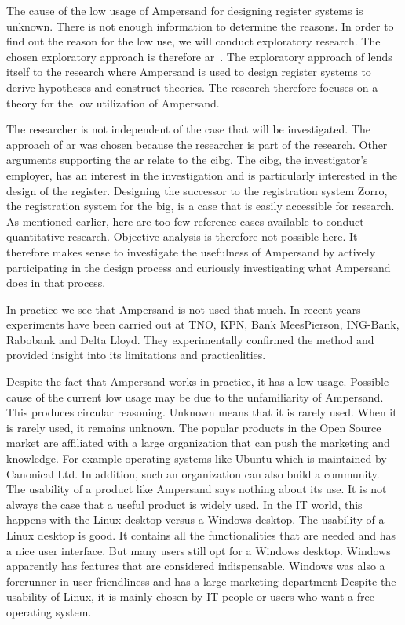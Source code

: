 The cause of the low usage of Ampersand for designing register systems is unknown.
There is not enough information to determine the reasons.
In order to find out the reason for the low use, we will conduct exploratory research.
The chosen exploratory approach is therefore \acrfull{ar}~\citep{Easterbrook}.
The exploratory approach of \cite{Easterbrook} lends itself to the research where Ampersand is used to design register systems to derive hypotheses and construct theories.
The research therefore focuses on a theory for the low utilization of Ampersand.

The researcher is not independent of the case that will be investigated.
The approach of \acrshort{ar} was chosen because the researcher is part of the research.
Other arguments supporting the \acrshort{ar} relate to the \acrshort{cibg}.
The \acrshort{cibg}, the investigator's employer, has an interest in the investigation and is particularly interested in the design of the register.
Designing the successor to the registration system Zorro, the registration system for the \acrshort{big}, is a case that is easily accessible for research.
As mentioned earlier, here are too few reference cases available to conduct quantitative research.
Objective analysis is therefore not possible here.
It therefore makes sense to investigate the usefulness of Ampersand by actively participating in the design process and curiously investigating what Ampersand does in that process.


In practice we see that Ampersand is not used that much.
In recent years experiments have been carried out at TNO, KPN, Bank MeesPierson, ING-Bank, Rabobank and Delta Lloyd.
They experimentally confirmed the method and provided insight into its limitations and practicalities.

Despite the fact that Ampersand works in practice, it has a low usage.
Possible cause of the current low usage may be due to the unfamiliarity of Ampersand.
This produces circular reasoning.
Unknown means that it is rarely used.
When it is rarely used, it remains unknown.
The popular products in the Open Source market are affiliated with a large organization that can push the marketing and knowledge. 
For example operating systems like Ubuntu which is maintained by Canonical Ltd.
In addition, such an organization can also build a community.
The usability of a product like Ampersand says nothing about its use.
It is not always the case that a useful product is widely used.
In the IT world, this happens with the Linux desktop versus a Windows desktop.
The usability of a Linux desktop is good.
It contains all the functionalities that are needed and has a nice user interface.
But many users still opt for a Windows desktop.
Windows apparently has features that are considered indispensable.
Windows was also a forerunner in user-friendliness and has a large marketing department
Despite the usability of Linux, it is mainly chosen by IT people or users who want a free operating system.


